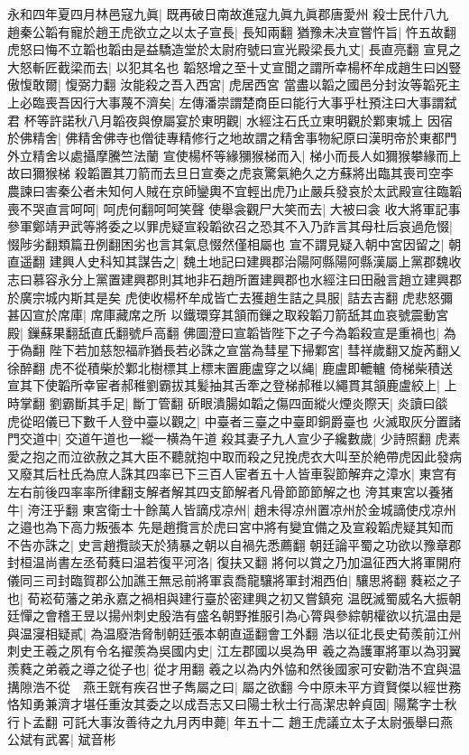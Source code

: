 永和四年夏四月林邑寇九眞|{
	既再破日南故進寇九眞九眞郡唐愛州}
殺士民什八九　趙秦公韜有寵於趙王虎欲立之以太子宣長|{
	長知兩翻}
猶豫未决宣嘗忤旨|{
	忤五故翻}
虎怒曰悔不立韜也韜由是益驕造堂於太尉府號曰宣光殿梁長九丈|{
	長直亮翻}
宣見之大怒斬匠截梁而去|{
	以犯其名也}
韜怒增之至十丈宣聞之謂所幸楊杯牟成趙生曰凶豎傲愎敢爾|{
	愎弼力翻}
汝能殺之吾入西宮|{
	虎居西宮}
當盡以韜之國邑分封汝等韜死主上必臨喪吾因行大事蔑不濟矣|{
	左傳潘崇謂楚商臣曰能行大事乎杜預注曰大事謂弑君}
杯等許諾秋八月韜夜與僚屬宴於東明觀|{
	水經注石氏立東明觀於鄴東城上}
因宿於佛精舍|{
	佛精舍佛寺也僧徒專精修行之地故謂之精舍事物紀原曰漢明帝於東都門外立精舍以處攝摩騰竺法蘭}
宣使楊杯等緣獼猴梯而入|{
	梯小而長人如獮猴攀緣而上故曰獮猴梯}
殺韜置其刀箭而去旦日宣奏之虎哀驚氣絶久之方蘇將出臨其喪司空李農諫曰害秦公者未知何人賊在京師鑾輿不宜輕出虎乃止嚴兵發哀於太武殿宣往臨韜喪不哭直言呵呵|{
	呵虎何翻呵呵笑聲}
使舉衾觀尸大笑而去|{
	大被曰衾}
收大將軍記事參軍鄭靖尹武等將委之以罪虎疑宣殺韜欲召之恐其不入乃詐言其母杜后哀過危惙|{
	惙陟劣翻類篇丑例翻困劣也言其氣息惙然僅相屬也}
宣不謂見疑入朝中宮因留之|{
	朝直遥翻}
建興人史科知其謀告之|{
	魏土地記曰建興郡治陽阿縣陽阿縣漢屬上黨郡魏收志曰慕容永分上黨置建興郡則其地非石趙所置建興郡也水經注曰田融言趙立建興郡於廣宗城内斯其是矣}
虎使收楊杯牟成皆亡去獲趙生詰之具服|{
	詰去吉翻}
虎悲怒彌甚囚宣於席庫|{
	席庫藏席之所}
以鐵環穿其頷而鏁之取殺韜刀箭舐其血哀號震動宮殿|{
	鏁蘇果翻舐直氏翻號戶高翻}
佛圖澄曰宣韜皆陛下之子今為韜殺宣是重禍也|{
	為于偽翻}
陛下若加慈恕福祚猶長若必誅之宣當為彗星下掃鄴宮|{
	彗祥歲翻又旋芮翻乂徐醉翻}
虎不從積柴於鄴北樹標其上標末置鹿盧穿之以䋲|{
	鹿盧即轆轤}
倚梯柴積送宣其下使韜所幸宦者郝稚劉霸拔其髪抽其舌牽之登梯郝稚以繩貫其頷鹿盧絞上|{
	上時掌翻}
劉霸斷其手足|{
	斷丁管翻}
斫眼潰腸如韜之傷四面縱火煙炎際天|{
	炎讀曰燄}
虎從昭儀已下數千人登中臺以觀之|{
	中臺者三臺之中臺即銅爵臺也}
火滅取灰分置諸門交道中|{
	交道午道也一縱一横為午道}
殺其妻子九人宣少子纔數歲|{
	少詩照翻}
虎素愛之抱之而泣欲赦之其大臣不聽就抱中取而殺之兒挽虎衣大叫至於絶帶虎因此發病又廢其后杜氏為庶人誅其四率已下三百人宦者五十人皆車裂節解弃之漳水|{
	東宫有左右前後四率率所律翻支解者解其四支節解者凡骨節節節解之也}
洿其東宮以養猪牛|{
	洿汪乎翻}
東宮衛士十餘萬人皆謫戍凉州|{
	趙未得凉州置凉州於金城謫使戍凉州之邉也為下高力叛張本}
先是趙攬言於虎曰宮中將有變宜備之及宣殺韜虎疑其知而不告亦誅之|{
	史言趙攬談天於猜暴之朝以自禍先悉薦翻}
朝廷論平蜀之功欲以豫章郡封桓温尚書左丞荀蕤曰温若復平河洛|{
	復扶又翻}
將何以賞之乃加温征西大將軍開府儀同三司封臨賀郡公加譙王無忌前將軍袁喬龍驤將軍封湘西伯|{
	驤思將翻}
蕤崧之子也|{
	荀崧荀藩之弟永嘉之禍相與建行臺於密建興之初又嘗鎮宛}
温旣滅蜀威名大振朝廷憚之會稽王昱以揚州刺史殷浩有盛名朝野推服引為心膂與參綜朝權欲以抗温由是與温寖相疑貳|{
	為温廢浩脅制朝廷張本朝直遥翻會工外翻}
浩以征北長史荀羨前江州刺史王羲之夙有令名擢羨為吳國内史|{
	江左郡國以吳為甲}
羲之為護軍將軍以為羽翼羨蕤之弟羲之導之從子也|{
	從才用翻}
羲之以為内外恊和然後國家可安勸浩不宜與温搆隙浩不從　燕王皝有疾召世子雋屬之曰|{
	屬之欲翻}
今中原未平方資賢傑以經世務恪知勇兼濟才堪任重汝其委之以成吾志又曰陽士秋士行高潔忠幹貞固|{
	陽騖字士秋行卜孟翻}
可託大事汝善待之九月丙申薨|{
	年五十二}
趙王虎議立太子太尉張舉曰燕公斌有武畧|{
	斌音彬}


